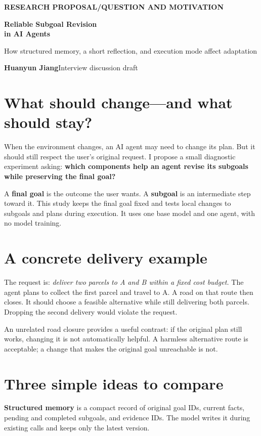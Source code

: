\documentclass[11pt,a4paper]{article}
\newcommand{\kicker}[1]{{\sffamily\small\bfseries\color{teal}#1}\par}
\begin{document}
\kicker{RESEARCH PROPOSAL\quad /\quad QUESTION AND MOTIVATION}
{\sffamily\fontsize{25}{29}\selectfont\bfseries\color{navy}Reliable Subgoal Revision\\in AI Agents\par}
\vspace{5pt}
{\sffamily\fontsize{12}{16}\selectfont How structured memory, a short reflection, and execution mode affect adaptation\par}
\vspace{5pt}
\textbf{Huanyun Jiang}\hfill Interview discussion draft

\section{What should change—and what should stay?}
When the environment changes, an AI agent may need to change its plan. But it should still respect the user's original request. I propose a small diagnostic experiment asking: \textbf{which components help an agent revise its subgoals while preserving the final goal?}

A \textbf{final goal} is the outcome the user wants. A \textbf{subgoal} is an intermediate step toward it. This study keeps the final goal fixed and tests local changes to subgoals and plans during execution. It uses one base model and one agent, with no model training.

\section{A concrete delivery example}
The request is: \textit{deliver two parcels to A and B within a fixed cost budget.} The agent plans to collect the first parcel and travel to A. A road on that route then closes. It should choose a feasible alternative while still delivering both parcels. Dropping the second delivery would violate the request.

An unrelated road closure provides a useful contrast: if the original plan still works, changing it is not automatically helpful. A harmless alternative route is acceptable; a change that makes the original goal unreachable is not.

\section{Three simple ideas to compare}
\textbf{Structured memory} is a compact record of original goal IDs, current facts, pending and completed subgoals, and evidence IDs. The model writes it during existing calls and keeps only the latest version.
\end{document}
